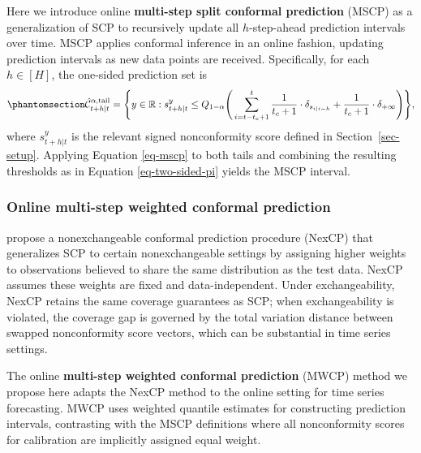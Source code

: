 \documentclass[
  american,
  12pt]{article}
\theoremstyle{plain}
\theoremstyle{plain}
\theoremstyle{remark}
\begin{document}
Here we introduce online \textbf{multi-step split conformal prediction}
(MSCP) as a generalization of SCP \citep{papadopoulos2002, vovk2005} to
recursively update all \(h\)-step-ahead prediction intervals over time.
MSCP applies conformal inference in an online fashion, updating
prediction intervals as new data points are received. Specifically, for
each \(h \in [H]\), the one-sided prediction set is
\begin{equation}\phantomsection\label{eq-mscp}{
\hat{\mathcal{C}}_{t+h|t}^{\alpha,\mathrm{tail}} = \Bigg\{y\in\mathbb{R}: s_{t+h|t}^{y} \leq Q_{1-\alpha}\Bigg(\sum_{i=t-t_c+1}^{t}\frac{1}{t_c+1}\cdot\delta_{s_{i|i-h}}+\frac{1}{t_c+1}\cdot\delta_{+\infty}\Bigg)\Bigg\},
}\end{equation} where \(s_{t+h|t}^{y}\) is the relevant signed
nonconformity score defined in Section~\ref{sec-setup}. Applying
Equation \eqref{eq-mscp} to both tails and combining the resulting
thresholds as in Equation \eqref{eq-two-sided-pi} yields the MSCP
interval.

\subsubsection{Online multi-step weighted conformal
prediction}\label{online-multi-step-weighted-conformal-prediction}

\citet{barber2023} propose a nonexchangeable conformal prediction
procedure (NexCP) that generalizes SCP to certain nonexchangeable
settings by assigning higher weights to observations believed to share
the same distribution as the test data. NexCP assumes these weights are
fixed and data-independent. Under exchangeability, NexCP retains the
same coverage guarantees as SCP; when exchangeability is violated, the
coverage gap is governed by the total variation distance between swapped
nonconformity score vectors, which can be substantial in time series
settings.

The online \textbf{multi-step weighted conformal prediction} (MWCP)
method we propose here adapts the NexCP method to the online setting for
time series forecasting. MWCP uses weighted quantile estimates for
constructing prediction intervals, contrasting with the MSCP definitions
where all nonconformity scores for calibration are implicitly assigned
equal weight.
\end{document}

